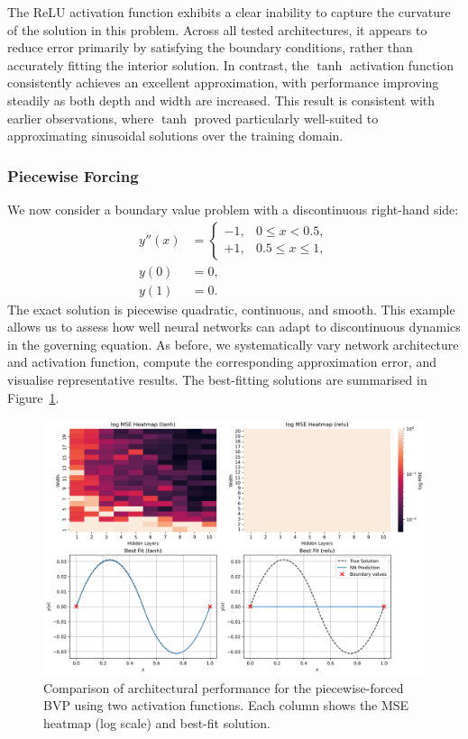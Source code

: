The ReLU activation function exhibits a clear inability to capture the curvature of the solution 
in this problem. Across all tested architectures, it appears to reduce error primarily by satisfying
the boundary conditions, rather than accurately fitting the interior solution. In contrast, 
the $\tanh$ activation function consistently achieves an excellent approximation, with 
performance improving steadily as both depth and width are increased. This result is 
consistent with earlier observations, where $\tanh$ proved particularly well-suited to 
approximating sinusoidal solutions over the training domain.

\subsubsection{Piecewise Forcing}

We now consider a boundary value problem with a discontinuous right-hand side:
\[
\begin{aligned}
    y''(x) &= 
    \begin{cases}
        -1, & 0 \leq x < 0.5, \\
        +1, & 0.5 \leq x \leq 1,
    \end{cases} \\
    y(0) &= 0, \\
    y(1) &= 0.
\end{aligned}
\]
The exact solution is piecewise quadratic, continuous, and smooth. This example allows us 
to assess how well neural networks can adapt to discontinuous dynamics
in the governing equation. As before, we systematically vary network architecture and activation 
function, compute the corresponding approximation error, and visualise representative results.
The best-fitting solutions are summarised in Figure~\ref{fig:bvp_piecewise_sidebyside}.

\begin{figure}[h]
    \centering
    \includegraphics[width=\textwidth]{graphics/bvp_piecewise_combined.png}
    \caption{Comparison of architectural performance for the piecewise-forced BVP using two 
    activation functions. Each column shows the MSE heatmap (log scale) and best-fit solution.}
    \label{fig:bvp_piecewise_sidebyside}
\end{figure}

